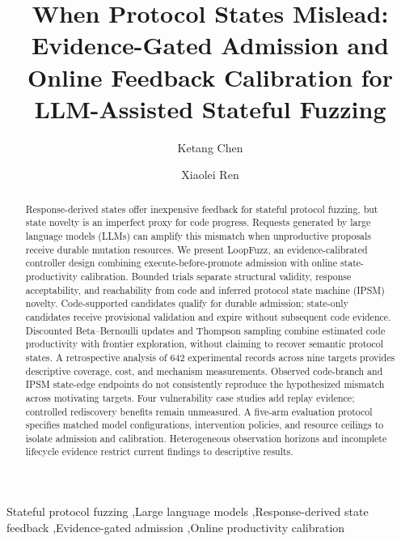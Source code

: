 \documentclass[final,5p,times,number]{elsarticle}
\begin{document}
\raggedbottom
\begin{frontmatter}
\title{When Protocol States Mislead: Evidence-Gated Admission and Online Feedback Calibration for LLM-Assisted Stateful Fuzzing}
\author[inst1]{Ketang Chen}
\author[inst1]{Xiaolei Ren}
\begin{abstract}
Response-derived states offer inexpensive feedback for stateful protocol fuzzing, but state novelty is an imperfect proxy for code progress. Requests generated by large language models (LLMs) can amplify this mismatch when unproductive proposals receive durable mutation resources. We present LoopFuzz, an evidence-calibrated controller design combining execute-before-promote admission with online state-productivity calibration. Bounded trials separate structural validity, response acceptability, and reachability from code and inferred protocol state machine (IPSM) novelty. Code-supported candidates qualify for durable admission; state-only candidates receive provisional validation and expire without subsequent code evidence. Discounted Beta--Bernoulli updates and Thompson sampling combine estimated code productivity with frontier exploration, without claiming to recover semantic protocol states. A retrospective analysis of 642 experimental records across nine targets provides descriptive coverage, cost, and mechanism measurements. Observed code-branch and IPSM state-edge endpoints do not consistently reproduce the hypothesized mismatch across motivating targets. Four vulnerability case studies add replay evidence; controlled rediscovery benefits remain unmeasured. A five-arm evaluation protocol specifies matched model configurations, intervention policies, and resource ceilings to isolate admission and calibration. Heterogeneous observation horizons and incomplete lifecycle evidence restrict current findings to descriptive results.
\end{abstract}
\begin{keyword}
Stateful protocol fuzzing \sep Large language models \sep Response-derived state feedback \sep Evidence-gated admission \sep Online productivity calibration
\end{keyword}
\end{frontmatter}
\end{document}
